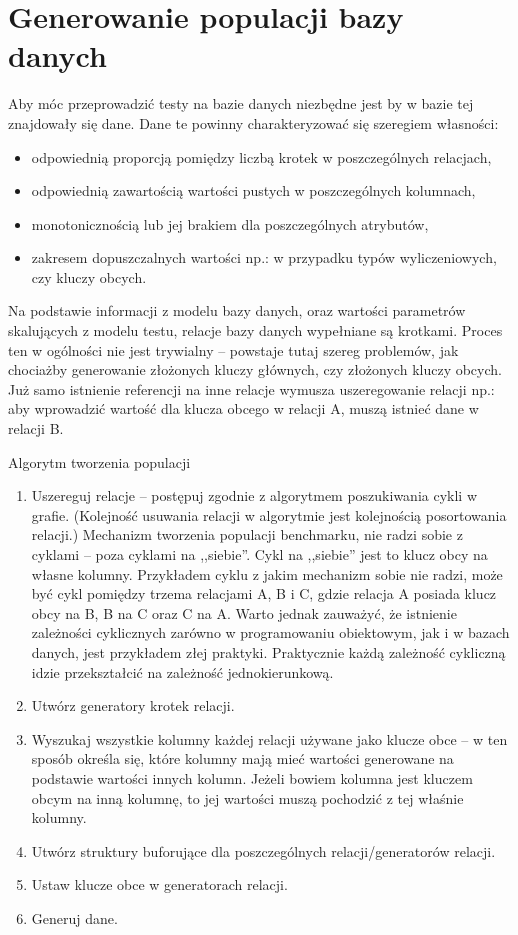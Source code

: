 \section{Generowanie populacji bazy danych}\label{sect:populationgeneration}
Aby móc przeprowadzić testy na bazie danych niezbędne jest by w bazie tej znajdowały się dane.
Dane te powinny charakteryzować się szeregiem własności:
\begin{itemize}
\item odpowiednią proporcją pomiędzy liczbą krotek w poszczególnych relacjach,
\item odpowiednią zawartością wartości pustych w poszczególnych kolumnach,
\item monotonicznością lub jej brakiem dla poszczególnych atrybutów,
\item zakresem dopuszczalnych wartości np.: w przypadku typów wyliczeniowych, czy kluczy obcych.
\end{itemize}
Na podstawie informacji z modelu bazy danych, oraz wartości parametrów skalujących z modelu 
testu, relacje bazy danych wypełniane są krotkami. Proces ten w ogólności nie jest trywialny -- 
powstaje tutaj szereg problemów, jak chociażby generowanie złożonych kluczy głównych, 
czy złożonych kluczy obcych. Już samo istnienie referencji na inne relacje wymusza uszeregowanie relacji np.: 
aby wprowadzić wartość dla klucza obcego w relacji A, muszą istnieć dane w relacji B.

Algorytm tworzenia populacji
\begin{enumerate}
\item Uszereguj relacje -- postępuj zgodnie z algorytmem poszukiwania cykli w grafie.
(Kolejność usuwania relacji w algorytmie jest kolejnością posortowania relacji.)
Mechanizm tworzenia populacji benchmarku, nie radzi sobie z cyklami -- poza cyklami na ,,siebie''.
Cykl na ,,siebie'' jest to klucz obcy na własne kolumny. Przykładem cyklu z jakim mechanizm sobie nie radzi,
może być cykl pomiędzy trzema relacjami A, B i C, gdzie relacja A posiada klucz obcy na B, B na C oraz C na A. 
Warto jednak zauważyć, że istnienie zależności cyklicznych zarówno w programowaniu obiektowym, 
jak i w bazach danych, jest przykładem złej praktyki. Praktycznie każdą zależność cykliczną 
idzie przekształcić na zależność jednokierunkową.

\item Utwórz generatory krotek relacji.
\item Wyszukaj wszystkie kolumny każdej relacji używane jako klucze obce -- w ten sposób określa się, 
które kolumny mają mieć wartości generowane na podstawie wartości innych kolumn. Jeżeli bowiem kolumna
jest kluczem obcym na inną kolumnę, to jej wartości muszą pochodzić z tej właśnie kolumny.
\item Utwórz struktury buforujące dla poszczególnych relacji/generatorów relacji.
\item Ustaw klucze obce w generatorach relacji.
\item Generuj dane.
\end{enumerate}
